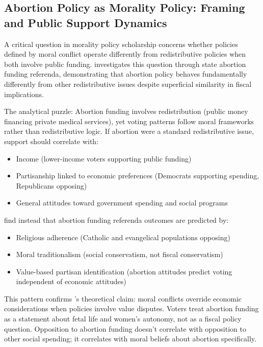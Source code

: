 \subsection{Abortion Policy as Morality Policy: Framing and Public Support Dynamics}
A critical question in morality policy scholarship concerns whether policies defined by moral conflict operate differently from redistributive policies when both involve public funding. \textcite{rohModelingOutcomesState2008} investigates this question through state abortion funding referenda, demonstrating that abortion policy behaves fundamentally differently from other redistributive issues despite superficial similarity in fiscal implications.

The analytical puzzle: Abortion funding involves redistribution (public money financing private medical services), yet voting patterns follow moral frameworks rather than redistributive logic. If abortion were a standard redistributive issue, support should correlate with:
\begin{itemize}
    \item Income (lower-income voters supporting public funding)
    \item Partisanship linked to economic preferences (Democrats supporting spending, Republicans opposing)
    \item General attitudes toward government spending and social programs
    \end{itemize}
\textcite{rohModelingOutcomesState2008} find instead that abortion funding referenda outcomes are predicted by:
\begin{itemize}
    \item Religious adherence (Catholic and evangelical populations opposing)
    \item Moral traditionalism (social conservatism, not fiscal conservatism)
    \item Value-based partisan identification (abortion attitudes predict voting independent of economic attitudes)
\end{itemize}

This pattern confirms \textcite{mooneyLegislativeMoralityAmerican1995}'s theoretical claim: moral conflicts override economic considerations when policies involve value disputes. Voters treat abortion funding as a statement about fetal life and women's autonomy, not as a fiscal policy question. Opposition to abortion funding doesn't correlate with opposition to other social spending; it correlates with moral beliefs about abortion specifically.

